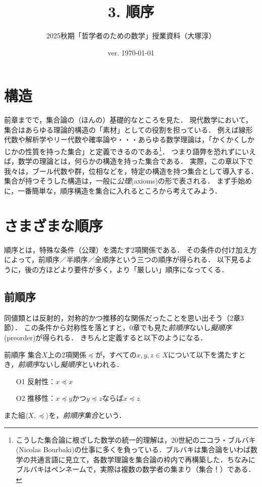 \documentclass[dvipdfmx,11pt,a4paper]{jsarticle}
\begin{document}
\title{3. 順序}
\author{2025秋期「哲学者のための数学」授業資料（大塚淳）}
\date{ver. \today}
\maketitle

\section{構造}
前章までで，集合論の（ほんの）基礎的なところを見た．
現代数学において，集合はあらゆる理論的構造の「素材」としての役割を担っている．
例えば線形代数や解析学やリー代数や確率論や・・・あらゆる数学理論は，「かくかくしかじかの性質を持った集合」と定義できるのである\footnote{こうした集合論に根ざした数学の統一的理解は，20世紀のニコラ・ブルバキ(Nicolas Bourbaki)の仕事に多くを負っている．ブルバキは集合論をいわば数学の共通言語に見立て，各数学理論を集合論の枠内で再構築した．ちなみにブルバキはペンネームで，実際は複数の数学者の集まり（集合！）である．}．
つまり語弊を恐れずにいえば，数学の理論とは，何らかの構造を持った集合である．
実際，この章以下で我々は，ブール代数や群，位相などを，特定の構造を持つ集合として導入する．
集合が持つそうした構造は，一般に\emph{公理}(axioms)の形で表される．
まず手始めに，一番簡単な，順序構造を集合に入れるところから考えてみよう．


\section{さまざまな順序}
順序とは，特殊な条件（公理）を満たす2項関係である．
その条件の付け加え方によって，前順序／半順序／全順序という三つの順序が得られる．
以下見るように，後の方ほどより要件が多く，より「厳しい」順序になってくる．


\subsection{前順序}
同値類とは反射的，対称的かつ推移的な関係だったことを思い出そう（2章3節）．
この条件から対称性を落とすと，0章でも見た\emph{前順序}ないし\emph{擬順序}(preorder)が得られる．
きちんと定義すると以下のようになる．

\begin{dfn}{前順序}{}
集合$X$上の2項関係$\preceq$が，すべての$x, y, z\in X$について以下を満たすとき，\emph{前順序}ないし\emph{擬順序}といわれる．
\begin{itemize}
 \item[O1] 反射性：$x \preceq x$
 \item[O2] 推移性：$x \preceq y$かつ$y \preceq z$ならば$x \preceq z$
\end{itemize}
また組$\langle X, \preceq \rangle$を，\emph{前順序集合}という． 
\end{dfn}
\end{document}
